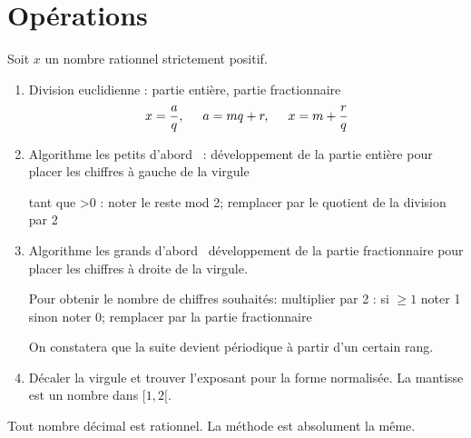 

\section{Opérations}
Soit $x$ un nombre rationnel strictement positif. 
\begin{enumerate}
  \item Division euclidienne : partie entière, partie fractionnaire
\begin{displaymath}
  x = \frac{a}{q},\hspace{0.5cm} a = mq + r, \hspace{0.5cm} x = m + \frac{r}{q}
\end{displaymath}
  \item Algorithme \og les petits d'abord\fg~ : développement de la partie entière pour placer les chiffres à gauche de la virgule
  \begin{center}
    tant que >0 : noter le reste mod 2; remplacer par le quotient de la division par 2
  \end{center}

  \item Algorithme \og les grands d'abord\fg~ développement de la partie fractionnaire pour placer les chiffres à droite de la virgule.
  \begin{center}
    Pour obtenir le nombre de chiffres souhaités:\newline
    multiplier par 2 : si $\geq 1$ noter 1 sinon noter 0; remplacer par la partie fractionnaire
  \end{center}
  On constatera que la suite devient périodique à partir d'un certain rang.
  
  \item Décaler la virgule et trouver l'exposant pour la forme normalisée. La mantisse est un nombre dans $[1,2[$.
\end{enumerate}

Tout nombre décimal est rationnel. La méthode est absolument la même.
